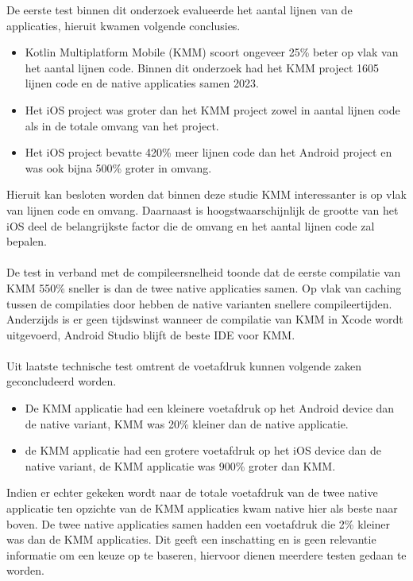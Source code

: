 De eerste test binnen dit onderzoek evalueerde het aantal lijnen van de applicaties, hieruit kwamen volgende conclusies.
\begin{itemize}
    \item Kotlin Multiplatform Mobile (KMM) scoort ongeveer 25\% beter op vlak van het aantal lijnen code. Binnen dit onderzoek had het KMM project 1605 lijnen code en de native applicaties samen 2023.
    \item Het iOS project was groter dan het KMM project zowel in aantal lijnen code als in de totale omvang van het project.
    \item Het iOS project bevatte 420\% meer lijnen code dan het Android project en was ook bijna 500\% groter in omvang.
\end{itemize}
Hieruit kan besloten worden dat binnen deze studie KMM interessanter is op vlak van lijnen code en omvang. Daarnaast is hoogstwaarschijnlijk de grootte van het iOS deel de belangrijkste factor die de omvang en het aantal lijnen code zal bepalen.
\\ \\ 
De test in verband met de compileersnelheid toonde dat de eerste compilatie van KMM 550\% sneller is dan de twee native applicaties samen. Op vlak van caching tussen de compilaties door hebben de native varianten snellere compileertijden. Anderzijds is er geen tijdswinst wanneer de compilatie van KMM in Xcode wordt uitgevoerd, Android Studio blijft de beste IDE voor KMM.
\\ \\ 
Uit laatste technische test omtrent de voetafdruk kunnen volgende zaken geconcludeerd worden.
\begin{itemize}
    \item De KMM applicatie had een kleinere voetafdruk op het Android device dan de native variant, KMM was 20\% kleiner dan de native applicatie.
    \item de KMM applicatie had een grotere voetafdruk op het iOS device dan de native variant, de KMM applicatie was 900\% groter dan KMM.
\end{itemize}
Indien er echter gekeken wordt naar de totale voetafdruk van de twee native applicatie ten opzichte van de KMM applicaties kwam native hier als beste naar boven. De twee native applicaties samen hadden een voetafdruk die 2\% kleiner was dan de KMM applicaties. Dit geeft een inschatting en is geen relevantie informatie om een keuze op te baseren, hiervoor dienen meerdere testen gedaan te worden.
\\ \\
